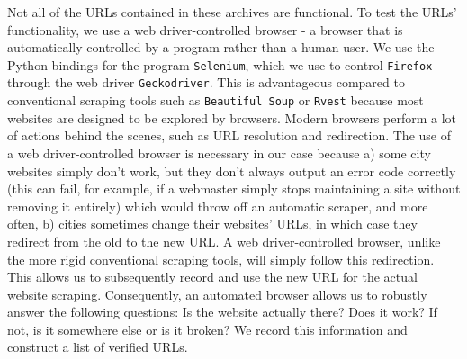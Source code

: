 \documentclass[11pt]{article}
\begin{document}
Not all of the URLs contained in these archives are functional. To test the URLs' functionality, we use a web driver-controlled browser - a browser that is automatically controlled by a program rather than a human user. We use the Python bindings for the program \texttt{Selenium}, which we use to control \texttt{Firefox} through the web driver  \texttt{Geckodriver}. This is advantageous compared to conventional scraping tools such as \texttt{Beautiful Soup} or \texttt{Rvest} because most websites are designed to be explored by browsers. Modern browsers perform a lot of actions behind the scenes, such as URL resolution and redirection. The use of a web driver-controlled browser is necessary in our case because a) some city websites simply don't work, but they don't always output an error code correctly (this can fail, for example, if a webmaster simply stops maintaining a site without removing it entirely) which would throw off an automatic scraper, and more often, b) cities sometimes change their websites' URLs, in which case they redirect from the old to the new URL. A web driver-controlled browser, unlike the more rigid conventional scraping tools, will simply follow this redirection. This allows us to subsequently record and use the new URL for the actual website scraping. Consequently, an automated browser allows us to robustly answer the following questions: Is the website actually there? Does it work? If not, is it somewhere else or is it broken? We record this information and construct a list of verified URLs.
\end{document}
